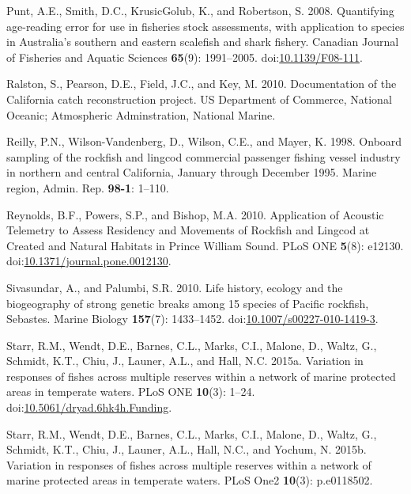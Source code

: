 \documentclass[11pt,
  english,
  letterpaper,
]{article}
\newlength{\cslhangindent}
\newenvironment{CSLReferences}[2] %
 {%
  \setlength{\parindent}{0pt}
  \ifodd #1 \everypar{\setlength{\hangindent}{\cslhangindent}}\ignorespaces\fi
  \ifnum #2 > 0
  \setlength{\parskip}{#2\baselineskip}
  \fi
 }%
 {}
\begin{document}
\begin{CSLReferences}{1}{0}
\leavevmode{}%
Punt, A.E., Smith, D.C., KrusicGolub, K., and Robertson, S. 2008. Quantifying age-reading error for use in fisheries stock assessments, with application to species in {Australia}'s southern and eastern scalefish and shark fishery. Canadian Journal of Fisheries and Aquatic Sciences \textbf{65}(9): 1991--2005. doi:\href{https://doi.org/10.1139/F08-111}{10.1139/F08-111}.

\leavevmode{}%
Ralston, S., Pearson, D.E., Field, J.C., and Key, M. 2010. Documentation of the {California} catch reconstruction project. US Department of Commerce, National Oceanic; Atmospheric Adminstration, National Marine.

\leavevmode{}%
Reilly, P.N., Wilson-Vandenberg, D., Wilson, C.E., and Mayer, K. 1998. Onboard sampling of the rockfish and lingcod commercial passenger fishing vessel industry in northern and central {California}, {January} through {December} 1995. Marine region, Admin. Rep. \textbf{98-1}: 1--110.

\leavevmode{}%
Reynolds, B.F., Powers, S.P., and Bishop, M.A. 2010. Application of {Acoustic} {Telemetry} to {Assess} {Residency} and {Movements} of {Rockfish} and {Lingcod} at {Created} and {Natural} {Habitats} in {Prince} {William} {Sound}. PLoS ONE \textbf{5}(8): e12130. doi:\href{https://doi.org/10.1371/journal.pone.0012130}{10.1371/journal.pone.0012130}.

\leavevmode{}%
Sivasundar, A., and Palumbi, S.R. 2010. Life history, ecology and the biogeography of strong genetic breaks among 15 species of {Pacific} rockfish, {Sebastes}. Marine Biology \textbf{157}(7): 1433--1452. doi:\href{https://doi.org/10.1007/s00227-010-1419-3}{10.1007/s00227-010-1419-3}.

\leavevmode{}%
Starr, R.M., Wendt, D.E., Barnes, C.L., Marks, C.I., Malone, D., Waltz, G., Schmidt, K.T., Chiu, J., Launer, A.L., and Hall, N.C. 2015a. Variation in responses of fishes across multiple reserves within a network of marine protected areas in temperate waters. PLoS ONE \textbf{10}(3): 1--24. doi:\href{https://doi.org/10.5061/dryad.6hk4h.Funding}{10.5061/dryad.6hk4h.Funding}.

\leavevmode{}%
Starr, R.M., Wendt, D.E., Barnes, C.L., Marks, C.I., Malone, D., Waltz, G., Schmidt, K.T., Chiu, J., Launer, A.L., Hall, N.C., and Yochum, N. 2015b. Variation in responses of fishes across multiple reserves within a network of marine protected areas in temperate waters. PLoS One2 \textbf{10}(3): p.e0118502.


\end{CSLReferences}
\end{document}

